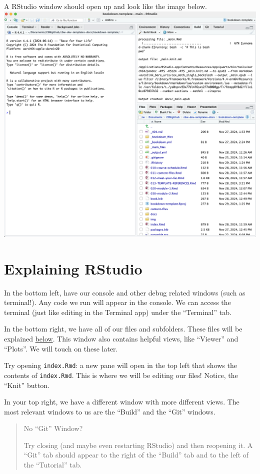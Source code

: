 \documentclass[
]{book}
\theoremstyle{definition}
\theoremstyle{definition}
\theoremstyle{definition}
\theoremstyle{definition}
\theoremstyle{remark}
\begin{document}
A RStudio window should open up and look like the image below.
\includegraphics{img/files-and-build/newly-opened-RStudio.png}\\

\section{Explaining RStudio}\label{explaining-rstudio}

In the bottom left, have our console and other debug related windows (such as terminal!). Any code we run will appear in the console. We can access the terminal (just like editing in the Terminal app) under the ``Terminal'' tab.

In the bottom right, we have all of our files and subfolders. These files will be explained \hyperref[file-setup]{below}. This window also contains helpful views, like ``Viewer'' and ``Plots''. We will touch on these later.

Try opening \texttt{index.Rmd}: a new pane will open in the top left that shows the contents of \texttt{index.Rmd}. This is where we will be editing our files! Notice, the ``Knit'' button.

In your top right, we have a different window with more different views. The most relevant windows to us are the ``Build'' and the ``Git'' windows.

\begin{quote}
No ``Git'' Window?

Try closing (and maybe even restarting RStudio) and then reopening it. A ``Git'' tab should appear to the right of the ``Build'' tab and to the left of the ``Tutorial'' tab.
\end{quote}
\end{document}
